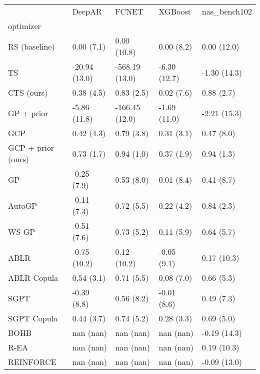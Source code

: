\begin{tabular}{lllll}
\toprule
{} &         DeepAR &           FCNET &       XGBoost &  nas\_bench102 \\
optimizer          &                &                 &               &               \\
\midrule
RS (baseline)      &     0.00 (7.1) &     0.00 (10.8) &    0.00 (8.2) &   0.00 (12.0) \\
TS                 &  -20.94 (13.0) &  -568.19 (13.0) &  -6.30 (12.7) &  -1.30 (14.3) \\
CTS (ours)         &     0.38 (4.5) &      0.83 (2.5) &    0.02 (7.6) &    0.88 (2.7) \\
GP + prior         &   -5.86 (11.8) &  -166.45 (12.0) &  -1.69 (11.0) &  -2.21 (15.3) \\
GCP                &     0.42 (4.3) &      0.79 (3.8) &    0.31 (3.1) &    0.47 (8.0) \\
GCP + prior (ours) &     0.73 (1.7) &      0.94 (1.0) &    0.37 (1.9) &    0.94 (1.3) \\
GP                 &    -0.25 (7.9) &      0.53 (8.0) &    0.01 (8.4) &    0.41 (8.7) \\
AutoGP             &    -0.11 (7.3) &      0.72 (5.5) &    0.22 (4.2) &    0.84 (2.3) \\
WS GP              &    -0.51 (7.6) &      0.73 (5.2) &    0.11 (5.9) &    0.64 (5.7) \\
ABLR               &   -0.75 (10.2) &     0.12 (10.2) &   -0.05 (9.1) &   0.17 (10.3) \\
ABLR Copula        &     0.54 (3.1) &      0.71 (5.5) &    0.08 (7.0) &    0.66 (5.3) \\
SGPT               &    -0.39 (8.8) &      0.56 (8.2) &   -0.01 (8.6) &    0.49 (7.3) \\
SGPT Copula        &     0.44 (3.7) &      0.74 (5.2) &    0.28 (3.3) &    0.69 (5.0) \\
BOHB               &      nan (nan) &       nan (nan) &     nan (nan) &  -0.19 (14.3) \\
R-EA               &      nan (nan) &       nan (nan) &     nan (nan) &   0.19 (10.3) \\
REINFORCE          &      nan (nan) &       nan (nan) &     nan (nan) &  -0.09 (13.0) \\
\bottomrule
\end{tabular}
